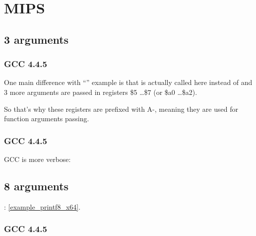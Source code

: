 ﻿\ifx\RUSSIAN\undefined
\section{MIPS}

\subsection{3 arguments}

\subsubsection{\Optimizing GCC 4.4.5}

One main difference with ``\HelloWorldSectionName'' example is that \printf is actually called here
instead of \puts and 3 more arguments are passed in registers \$5 \dots \$7 (or \$a0 \dots \$a2).

So that's why these registers are prefixed with A-, meaning they are used for function arguments passing.





\subsubsection{\NonOptimizing GCC 4.4.5}

\NonOptimizing GCC is more verbose:





\subsection{8 arguments}

: \ref{example_printf8_x64}.



\subsubsection{\Optimizing GCC 4.4.5}

